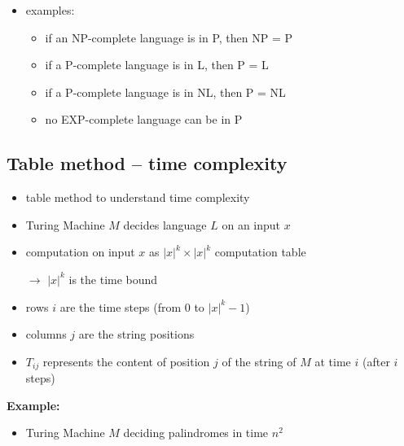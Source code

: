 \documentclass[a4]{scrartcl}
\begin{document}
\begin{itemize}

\item examples: 
\begin{itemize}
\item if an NP-complete language is in P, then NP = P 
\item if a P-complete language is in L, then P = L
\item if a P-complete language is in NL, then P = NL
\item no EXP-complete language can be in P
\end{itemize}

\end{itemize}

\subsection*{Table method -- time complexity}

\begin{itemize}
\item table method to understand time complexity
\item Turing Machine $M$ decides language $L$ on an input $x$
\item computation on input $x$ as $|x|^k \times |x|^k$ computation table
\item[$\rightarrow$] $|x|^k$ is the time bound
\item rows $i$ are the time steps (from $0$ to $|x|^k-1$)
\item columns $j$ are the string positions
\item $T_{ij}$ represents the content of position $j$ of the string of $M$ at time $i$ (after $i$ steps)
\end{itemize}

\newpage 
\textbf{Example:}

\begin{itemize}
\item Turing Machine $M$ deciding palindromes in time $n^2$
\end{itemize}
\end{document}
